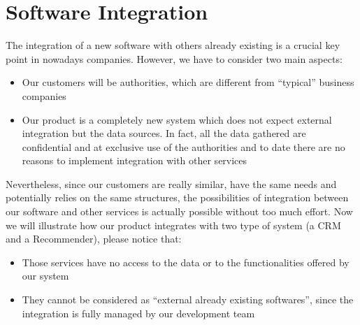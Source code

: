 \documentclass[../main.tex]{subfiles}
\begin{document}
    \section{Software Integration}
    The integration of a new software with others already existing is a crucial key point in nowadays companies.
    However, we have to consider two main aspects:
    \begin{itemize}
        \item Our customers will be authorities, which are different from “typical” business companies
        \item Our product is a completely new system which does not expect external integration but the data sources. In fact, all the data gathered are confidential and at exclusive use of the authorities and to date there are no reasons to implement integration with other services
    \end{itemize}
    Nevertheless, since our customers are really similar, have the same needs and potentially relies on the same structures, the possibilities of integration between our software and other services is actually possible without too much effort.
    Now we will illustrate how our product integrates with two type of system (a CRM and a Recommender), please notice that:
    \begin{itemize}
        \item Those services have no access to the data or to the functionalities offered by our system
        \item They cannot be considered as “external already existing softwares”, since the integration is fully managed by our development team
    \end{itemize}
\end{document}
